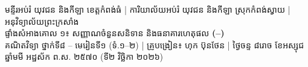 \documentclass[a4paper,10pt]{article}
\newcommand{\en}[1]{{\TimesEn #1}}
\newcommand{\enbf}[1]{{\TimesEn\textbf{#1}}}
\newcommand{\cnum}[1]{\mbox{\fontsize{10pt}{12pt}\selectfont\ding{\numexpr181+#1\relax}}}
\newcommand{\khmflourish}{{\Tacteing\fontsize{32pt}{13pt}\selectfont\raisebox{-4pt}{3}}}
\begin{document}
\clearpage

\begin{tcolorbox}[
  enhanced, sharp corners, colback=white, colframe=black,
  boxrule=1.5pt, borderline={0.6pt}{2.2pt}{black},
  boxsep=1pt, top=14pt, bottom=14pt, left=7pt, right=7pt
]
  \begin{center}
    {\fontsize{8.8pt}{12.0pt}\selectfont មន្ទីរអប់រំ យុវជន និងកីឡា ខេត្តកំពង់ធំ \en{|} ការិយាល័យអប់រំ យុវជន និងកីឡា ស្រុកកំពង់ស្វាយ \en{|} អនុវិទ្យាល័យព្រះក្រសាំង}\\[4pt]
    {\muol\fontsize{12.5pt}{18pt}\selectfont ផ្ទាំងសំអាងគោល ១៖ សញ្ញាណចំនួនសនិទាន និងធនាគារហេតុផល \enbf{(}\cnum{1}\enbf{–}\cnum{5}\enbf{)}}\\[4pt]
    {\fontsize{8.5pt}{11.5pt}\selectfont គណិតវិទ្យា ថ្នាក់ទី៨ \en{–} មេរៀនទី១ (ទំ.១\en{–}២) \en{|} គ្រូបង្រៀន៖ ហុក ប៊ុនថែន \en{|} ថ្ងៃចន្ទ ៨រោច ខែអស្សុជ ឆ្នាំមមី អដ្ឋស័ក ព.ស. ២៥៧០ (ទី២ វិច្ឆិកា ២០២៦)}\\[6pt]
    \khmflourish
  \end{center}
  \vspace{10pt}


\end{tcolorbox}
\end{document}
